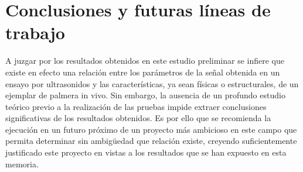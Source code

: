 \section{Conclusiones y futuras líneas de trabajo}

A juzgar por los resultados obtenidos en este estudio preliminar se infiere
que existe en efecto una relación entre los parámetros de la señal obtenida
en un ensayo por ultrasonidos y las características, ya sean físicas o
estructurales, de un ejemplar de palmera in vivo. Sin embargo, la ausencia
de un profundo estudio teórico previo a la realización de las pruebas
impide extraer conclusiones significativas de los resultados obtenidos. Es
por ello que se recomienda la ejecución en un futuro próximo de un proyecto
más ambicioso en este campo que permita determinar sin ambigüedad que
relación existe, creyendo suficientemente justificado este proyecto en
vistas a los resultados que se han expuesto en esta memoria.
